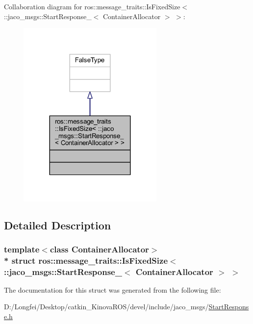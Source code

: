 Collaboration diagram for ros\+:\+:message\+\_\+traits\+:\+:Is\+Fixed\+Size$<$ \+:\+:jaco\+\_\+msgs\+:\+:Start\+Response\+\_\+$<$ Container\+Allocator $>$ $>$\+:
\nopagebreak
\begin{figure}[H]
\begin{center}
\leavevmode
\includegraphics[width=203pt]{d4/db8/structros_1_1message__traits_1_1IsFixedSize_3_01_1_1jaco__msgs_1_1StartResponse___3_01ContainerAllocator_01_4_01_4__coll__graph}
\end{center}
\end{figure}


\subsection{Detailed Description}
\subsubsection*{template$<$class Container\+Allocator$>$\\*
struct ros\+::message\+\_\+traits\+::\+Is\+Fixed\+Size$<$ \+::jaco\+\_\+msgs\+::\+Start\+Response\+\_\+$<$ Container\+Allocator $>$ $>$}



The documentation for this struct was generated from the following file\+:\begin{DoxyCompactItemize}
\item 
D\+:/\+Longfei/\+Desktop/catkin\+\_\+\+Kinova\+R\+O\+S/devel/include/jaco\+\_\+msgs/\hyperlink{StartResponse_8h}{Start\+Response.\+h}\end{DoxyCompactItemize}
